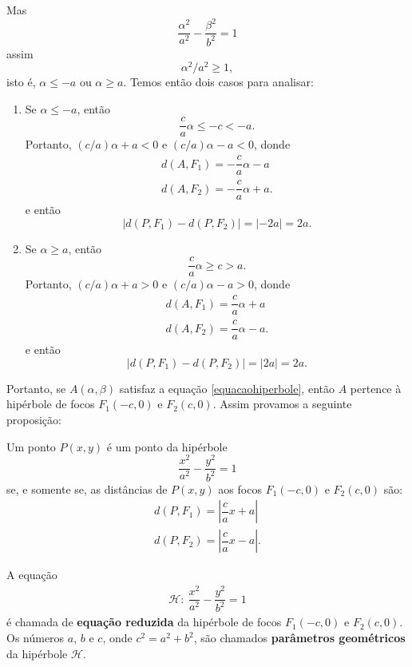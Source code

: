 Mas
\[
    \dfrac{\alpha^2}{a^2} - \dfrac{\beta^2}{b^2} = 1
\]
assim
\begin{equation}\label{pontohiperbole}
    \alpha^2/a^2 \ge 1,
\end{equation}
isto é, $\alpha \le -a$ ou $\alpha \ge a$. Temos então dois casos para analisar:
\begin{enumerate}
    \item Se $\alpha \le -a$, então
          \[
              \dfrac{c}{a}\alpha \le -c < -a.
          \]
          Portanto, $(c/a)\alpha + a < 0$ e $(c/a)\alpha - a < 0$, donde
          \begin{align*}
              d(A,F_1) = -\dfrac{c}{a}\alpha - a \\
              d(A,F_2) = -\dfrac{c}{a}\alpha + a.
          \end{align*}
          e então
          \[
              | d(P,F_1) - d(P,F_2)| = |-2a| = 2a.
          \]
    \item Se $\alpha \ge a$, então
          \[
              \dfrac{c}{a}\alpha \ge c > a.
          \]
          Portanto, $(c/a)\alpha + a > 0$ e $(c/a)\alpha - a > 0$, donde
          \begin{align*}
              d(A,F_1) = \dfrac{c}{a}\alpha + a \\
              d(A,F_2) = \dfrac{c}{a}\alpha - a.
          \end{align*}
          e então
          \[
              | d(P,F_1) - d(P,F_2)| = |2a| = 2a.
          \]
\end{enumerate}
Portanto, se $A(\alpha,\beta)$ satisfaz a equação \eqref{equacaohiperbole}, então $A$ pertence à hipérbole de focos $F_1(-c,0)$ e $F_2(c,0)$. Assim provamos a
seguinte proposição:

\begin{proposicao}
    Um ponto $P(x, y)$ é um ponto da hipérbole
    \[
        \dfrac{x^2}{a^2} - \dfrac{y^2}{b^2} = 1
    \]
    se, e somente se, as distâncias de $P(x, y)$ aos focos $F_1(-c, 0)$ e $F_2(c, 0)$ são:
    \begin{align*}
        d(P,F_1) = \left|\dfrac{c}{a}x + a\right| \\
        d(P,F_2) = \left|\dfrac{c}{a}x - a\right|.
    \end{align*}
\end{proposicao}

\begin{definicao}
    A equação
    \begin{align}\label{equacao_reduzida_da_hiperbole}
        \mathcal{H}:\ \dfrac{x^2}{a^2} - \dfrac{y^2}{b^2} = 1
    \end{align}
    é chamada de \textbf{equação reduzida} da hipérbole de focos $F_1(-c, 0)$ e $F_2(c, 0)$. Os números $a$, $b$ e $c$, onde $c^2 = a^2 + b^2$, são chamados
    \textbf{parâmetros geométricos} da hipérbole $\mathcal{H}$.  
\end{definicao}

